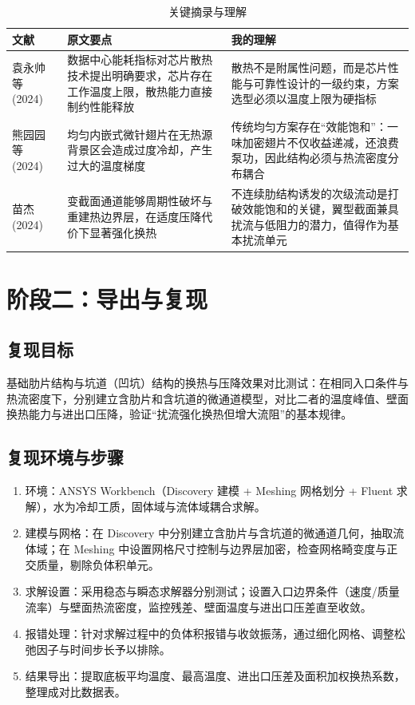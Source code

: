 \documentclass[stage1]{ydzjreport}
\begin{document}
\begin{table}[htbp]
\centering
\caption{关键摘录与理解}
\begin{tabularx}{\textwidth}{@{}Y Y Y@{}}
\toprule
{} 文献 & 原文要点 & 我的理解 \\
\midrule
袁永帅等 (2024) & 数据中心能耗指标对芯片散热技术提出明确要求，芯片存在工作温度上限，散热能力直接制约性能释放 & 散热不是附属性问题，而是芯片性能与可靠性设计的一级约束，方案选型必须以温度上限为硬指标 \\
熊园园等 (2024) & 均匀内嵌式微针翅片在无热源背景区会造成过度冷却，产生过大的温度梯度 & 传统均匀方案存在“效能饱和”：一味加密翅片不仅收益递减，还浪费泵功，因此结构必须与热流密度分布耦合 \\
苗杰 (2024) & 变截面通道能够周期性破坏与重建热边界层，在适度压降代价下显著强化换热 & 不连续肋结构诱发的次级流动是打破效能饱和的关键，翼型截面兼具扰流与低阻力的潜力，值得作为基本扰流单元 \\
\bottomrule
\end{tabularx}
\end{table}


\section{阶段二：导出与复现}


\subsection{复现目标}

基础肋片结构与坑道（凹坑）结构的换热与压降效果对比测试：在相同入口条件与热流密度下，分别建立含肋片和含坑道的微通道模型，对比二者的温度峰值、壁面换热能力与进出口压降，验证“扰流强化换热但增大流阻”的基本规律。

\subsection{复现环境与步骤}

\begin{enumerate}
  \item 环境：ANSYS Workbench（Discovery 建模 + Meshing 网格划分 + Fluent 求解），水为冷却工质，固体域与流体域耦合求解。
  \item 建模与网格：在 Discovery 中分别建立含肋片与含坑道的微通道几何，抽取流体域；在 Meshing 中设置网格尺寸控制与边界层加密，检查网格畸变度与正交质量，剔除负体积单元。
  \item 求解设置：采用稳态与瞬态求解器分别测试；设置入口边界条件（速度/质量流率）与壁面热流密度，监控残差、壁面温度与进出口压差直至收敛。
  \item 报错处理：针对求解过程中的负体积报错与收敛振荡，通过细化网格、调整松弛因子与时间步长予以排除。
  \item 结果导出：提取底板平均温度、最高温度、进出口压差及面积加权换热系数，整理成对比数据表。
\end{enumerate}
\end{document}
